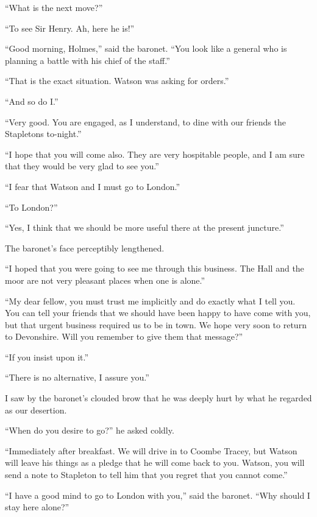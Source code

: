 \documentclass[paper=a5,BCOR=7mm,twoside,DIV=calc,12pt,usegeometry,openany,chapterprefix,endperiod,headings=big]{scrbook} %
\begin{document}
\enquote{What is the next move?}

\enquote{To see Sir Henry. Ah, here he is!}

\enquote{Good morning, Holmes,} said the baronet. \enquote{You look like a general who is planning a battle with his chief of the staff.}

\enquote{That is the exact situation. Watson was asking for orders.}

\enquote{And so do I.}

\enquote{Very good. You are engaged, as I understand, to dine with our friends the Stapletons to-night.}

\enquote{I hope that you will come also. They are very hospitable people, and I am sure that they would be very glad to see you.}

\enquote{I fear that Watson and I must go to London.}

\enquote{To London?}

\enquote{Yes, I think that we should be more useful there at the present juncture.}

The baronet's face perceptibly lengthened.

\enquote{I hoped that you were going to see me through this business. The Hall and the moor are not very pleasant places when one is alone.}

\enquote{My dear fellow, you must trust me implicitly and do exactly what I tell you. You can tell your friends that we should have been happy to have come with you, but that urgent business required us to be in town. We hope very soon to return to Devonshire. Will you remember to give them that message?}

\enquote{If you insist upon it.}

\enquote{There is no alternative, I assure you.}

I saw by the baronet's clouded brow that he was deeply hurt by what he regarded as our desertion.

\enquote{When do you desire to go?} he asked coldly.

\enquote{Immediately after breakfast. We will drive in to Coombe \newline Tracey, but Watson will leave his things as a pledge that he will come back to you. Watson, you will send a note to Stapleton to tell him that you regret that you cannot come.}

\enquote{I have a good mind to go to London with you,} said the baronet. \enquote{Why should I stay here alone?}
\end{document}
